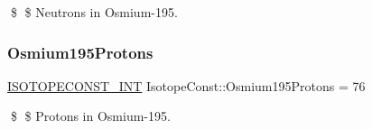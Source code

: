 \$ \$ Neutrons in Osmium-\/195. \mbox{\label{group___isotope_const-_osmium-_os195_ga5b71c3226cb30450210ab55c053972bc}} 
\subsubsection{\texorpdfstring{Osmium195\+Protons}{Osmium195Protons}}
{\footnotesize\ttfamily \mbox{\hyperlink{group___isotope_const-_macros_ga5f18360b3e99483a35c32d789e62621c}{I\+S\+O\+T\+O\+P\+E\+C\+O\+N\+S\+T\+\_\+\+I\+NT}} Isotope\+Const\+::\+Osmium195\+Protons = 76}

\$ \$ Protons in Osmium-\/195. 